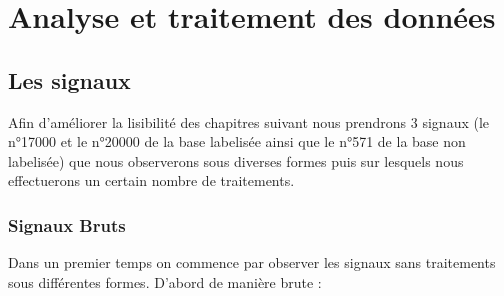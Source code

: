 
\hypertarget{Analyse-et-traitement-des-donnuxe9es}{%
\chapter{Analyse et traitement des données}\label{Analyse-et-traitement-des-donnuxe9es}}

\hypertarget{Les-signaux}{%
\section{Les signaux}
\label{Les-signaux}}

Afin d'améliorer la lisibilité des chapitres suivant nous prendrons 3 signaux (le n°17000 et le n°20000 de la base labelisée ainsi que le n°571 de la base non labelisée) que nous observerons sous diverses formes puis sur lesquels nous effectuerons un certain nombre de traitements.

\hypertarget{Signaux-Bruts}{%
\subsection{Signaux Bruts}
\label{Signaux-Bruts}}

Dans un premier temps on commence par observer les signaux sans traitements sous différentes formes.\n
D'abord de manière brute :

